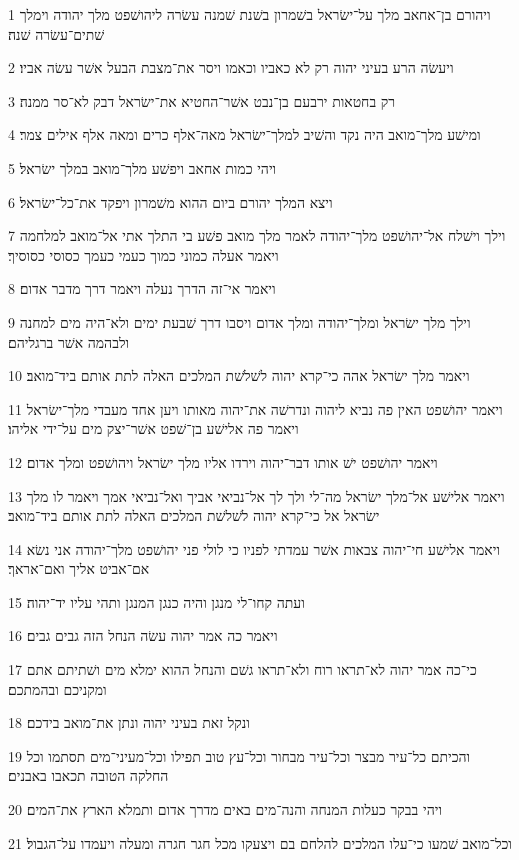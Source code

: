 \par 1 ויהורם בן־אחאב מלך על־ישׂראל בשׁמרון בשׁנת שׁמנה עשׂרה ליהושׁפט מלך יהודה וימלך שׁתים־עשׂרה שׁנה׃
\par 2 ויעשׂה הרע בעיני יהוה רק לא כאביו וכאמו ויסר את־מצבת הבעל אשׁר עשׂה אביו׃
\par 3 רק בחטאות ירבעם בן־נבט אשׁר־החטיא את־ישׂראל דבק לא־סר ממנה׃
\par 4 ומישׁע מלך־מואב היה נקד והשׁיב למלך־ישׂראל מאה־אלף כרים ומאה אלף אילים צמר׃
\par 5 ויהי כמות אחאב ויפשׁע מלך־מואב במלך ישׂראל׃
\par 6 ויצא המלך יהורם ביום ההוא משׁמרון ויפקד את־כל־ישׂראל׃
\par 7 וילך וישׁלח אל־יהושׁפט מלך־יהודה לאמר מלך מואב פשׁע בי התלך אתי אל־מואב למלחמה ויאמר אעלה כמוני כמוך כעמי כעמך כסוסי כסוסיך׃
\par 8 ויאמר אי־זה הדרך נעלה ויאמר דרך מדבר אדום׃
\par 9 וילך מלך ישׂראל ומלך־יהודה ומלך אדום ויסבו דרך שׁבעת ימים ולא־היה מים למחנה ולבהמה אשׁר ברגליהם׃
\par 10 ויאמר מלך ישׂראל אהה כי־קרא יהוה לשׁלשׁת המלכים האלה לתת אותם ביד־מואב׃
\par 11 ויאמר יהושׁפט האין פה נביא ליהוה ונדרשׁה את־יהוה מאותו ויען אחד מעבדי מלך־ישׂראל ויאמר פה אלישׁע בן־שׁפט אשׁר־יצק מים על־ידי אליהו׃
\par 12 ויאמר יהושׁפט ישׁ אותו דבר־יהוה וירדו אליו מלך ישׂראל ויהושׁפט ומלך אדום׃
\par 13 ויאמר אלישׁע אל־מלך ישׂראל מה־לי ולך לך אל־נביאי אביך ואל־נביאי אמך ויאמר לו מלך ישׂראל אל כי־קרא יהוה לשׁלשׁת המלכים האלה לתת אותם ביד־מואב׃
\par 14 ויאמר אלישׁע חי־יהוה צבאות אשׁר עמדתי לפניו כי לולי פני יהושׁפט מלך־יהודה אני נשׂא אם־אביט אליך ואם־אראך׃
\par 15 ועתה קחו־לי מנגן והיה כנגן המנגן ותהי עליו יד־יהוה׃
\par 16 ויאמר כה אמר יהוה עשׂה הנחל הזה גבים גבים׃
\par 17 כי־כה אמר יהוה לא־תראו רוח ולא־תראו גשׁם והנחל ההוא ימלא מים ושׁתיתם אתם ומקניכם ובהמתכם׃
\par 18 ונקל זאת בעיני יהוה ונתן את־מואב בידכם׃
\par 19 והכיתם כל־עיר מבצר וכל־עיר מבחור וכל־עץ טוב תפילו וכל־מעיני־מים תסתמו וכל החלקה הטובה תכאבו באבנים׃
\par 20 ויהי בבקר כעלות המנחה והנה־מים באים מדרך אדום ותמלא הארץ את־המים׃
\par 21 וכל־מואב שׁמעו כי־עלו המלכים להלחם בם ויצעקו מכל חגר חגרה ומעלה ויעמדו על־הגבול׃
